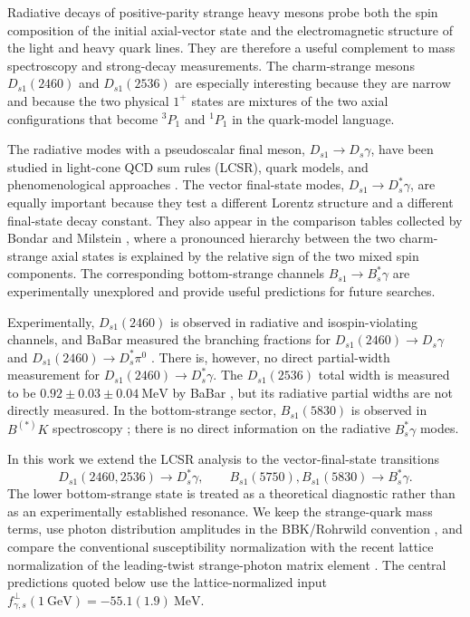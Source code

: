 \documentclass[aps,prd,a4paper,preprint,preprintnumbers,titlepage,
nofootinbib,superscriptaddress]{revtex4-2}
\newcommand{\Ds}{D_s}
\newcommand{\Dst}{D_s^\ast}
\newcommand{\Dsone}{D_{s1}}
\newcommand{\Bst}{B_s^\ast}
\newcommand{\Bsone}{B_{s1}}
\newcommand{\GeV}{\mathrm{GeV}}
\newcommand{\MeV}{\mathrm{MeV}}
\newcommand{\fgammas}{f_{\gamma,s}^{\perp}}
\begin{document}
Radiative decays of positive-parity strange heavy mesons probe both the
spin composition of the initial axial-vector state and the electromagnetic
structure of the light and heavy quark lines.  They are therefore a useful
complement to mass spectroscopy and strong-decay measurements.  The
charm-strange mesons \(\Dsone(2460)\) and \(\Dsone(2536)\) are especially
interesting because they are narrow and because the two physical \(1^+\)
states are mixtures of the two axial configurations that become
\({}^3P_1\) and \({}^1P_1\) in the quark-model language.

The radiative modes with a pseudoscalar final meson,
\(\Dsone\to\Ds\gamma\), have been studied in light-cone QCD sum rules
(LCSR), quark models, and phenomenological approaches
\cite{Goity:2000dk,Godfrey:2005ww,Colangelo:2005hv,Radford:2009bs,
Green:2016occ,Chen:2020ejk,Bondar:2023mua,Bondar:2025smw}.  The vector
final-state modes,
\(\Dsone\to\Dst\gamma\), are equally important because they test a different
Lorentz structure and a different final-state decay constant.  They also
appear in the comparison tables collected by Bondar and Milstein
\cite{Bondar:2025smw}, where a pronounced hierarchy between the two
charm-strange axial states is explained by the relative sign of the two mixed
spin components.  The corresponding bottom-strange channels
\(\Bsone\to\Bst\gamma\) are experimentally unexplored and provide useful
predictions for future searches.

Experimentally, \(\Dsone(2460)\) is observed in radiative and isospin-violating
channels, and BaBar measured the branching fractions for
\(\Dsone(2460)\to\Ds\gamma\) and \(\Dsone(2460)\to\Dst\pi^0\)
\cite{BaBar:2006eep}.  There is, however, no direct partial-width measurement
for \(\Dsone(2460)\to\Dst\gamma\).  The \(\Dsone(2536)\) total width is
measured to be \(0.92\pm0.03\pm0.04~\MeV\) by BaBar
\cite{BaBar:2011zpy}, but its radiative partial widths are not directly
measured.  In the bottom-strange sector, \(\Bsone(5830)\) is observed in
\(B^{(*)}K\) spectroscopy \cite{CMS:2018qdl}; there is no direct information
on the radiative \(\Bst\gamma\) modes.

In this work we extend the LCSR analysis to the vector-final-state transitions
\[
  \Dsone(2460,2536)\to\Dst\gamma,\qquad
  B_{s1}(5750),\Bsone(5830)\to\Bst\gamma .
\]
The lower bottom-strange state is treated as a theoretical diagnostic rather
than as an experimentally established resonance.  We keep the strange-quark
mass terms, use photon distribution amplitudes in the BBK/Rohrwild convention
\cite{Ball:2002ps,Rohrwild:2007yt}, and compare the conventional
susceptibility normalization with the recent lattice normalization of the
leading-twist strange-photon matrix element \cite{Bacchio:2024pij}.  The
central predictions quoted below use the lattice-normalized input
\(\fgammas(1~\GeV)=-55.1(1.9)~\MeV\).
\end{document}

